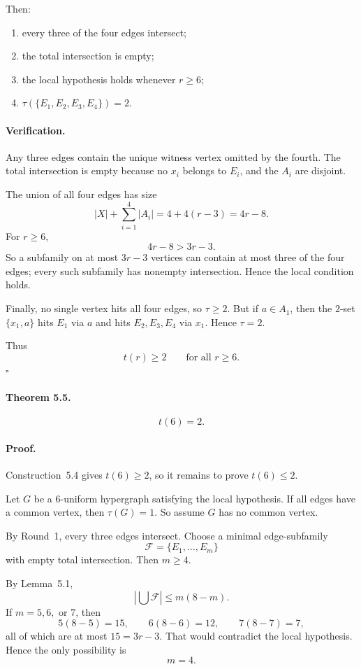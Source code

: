 Then:

\begin{enumerate}
\item every three of the four edges intersect;
\item the total intersection is empty;
\item the local hypothesis holds whenever $r\ge 6$;
\item $\tau(\{E_1,E_2,E_3,E_4\})=2$.
\end{enumerate}

\paragraph{Verification.}
Any three edges contain the unique witness vertex omitted by the fourth. The total intersection is empty because no $x_i$ belongs to $E_i$, and the $A_i$ are disjoint.

The union of all four edges has size
\[
|X|+\sum_{i=1}^4 |A_i|=4+4(r-3)=4r-8.
\]
For $r\ge 6$,
\[
4r-8>3r-3.
\]
So a subfamily on at most $3r-3$ vertices can contain at most three of the four edges; every such subfamily has nonempty intersection. Hence the local condition holds.

Finally, no single vertex hits all four edges, so $\tau\ge 2$. But if $a\in A_1$, then the $2$-set $\{x_1,a\}$ hits $E_1$ via $a$ and hits $E_2,E_3,E_4$ via $x_1$. Hence $\tau=2$.

Thus
\[
t(r)\ge 2 \qquad\text{for all } r\ge 6.
\]
\hfill $\square$

\paragraph{Theorem 5.5.}
\[
t(6)=2.
\]

\paragraph{Proof.}
Construction~5.4 gives $t(6)\ge 2$, so it remains to prove $t(6)\le 2$.

Let $G$ be a $6$-uniform hypergraph satisfying the local hypothesis. If all edges have a common vertex, then $\tau(G)=1$. So assume $G$ has no common vertex.

By Round~1, every three edges intersect. Choose a minimal edge-subfamily
\[
\mathcal{F}=\{E_1,\dots,E_m\}
\]
with empty total intersection. Then $m\ge 4$.

By Lemma~5.1,
\[
\left|\bigcup \mathcal{F}\right|\le m(8-m).
\]
If $m=5,6,$ or $7$, then
\[
5(8-5)=15,\qquad 6(8-6)=12,\qquad 7(8-7)=7,
\]
all of which are at most $15=3r-3$. That would contradict the local hypothesis. Hence the only possibility is
\[
m=4.
\]

